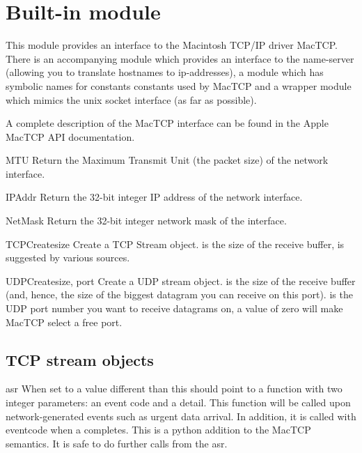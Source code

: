 \section{Built-in module }
\renewcommand{\indexsubitem}{(in module mactcp)}

This module provides an interface to the Macintosh TCP/IP driver
MacTCP. There is an accompanying module  which provides an
interface to the name-server (allowing you to translate hostnames to
ip-addresses), a module  which has symbolic names for
constants constants used by MacTCP and a wrapper module 
which mimics the unix socket interface (as far as possible).

A complete description of the MacTCP interface can be found in the
Apple MacTCP API documentation.

\begin{funcdesc}{MTU}{}
Return the Maximum Transmit Unit (the packet size) of the network
interface.
\end{funcdesc}

\begin{funcdesc}{IPAddr}{}
Return the 32-bit integer IP address of the network interface.
\end{funcdesc}

\begin{funcdesc}{NetMask}{}
Return the 32-bit integer network mask of the interface.
\end{funcdesc}

\begin{funcdesc}{TCPCreate}{size}
Create a TCP Stream object.  is the size of the receive
buffer,  is suggested by various sources.
\end{funcdesc}

\begin{funcdesc}{UDPCreate}{size, port}
Create a UDP stream object.  is the size of the receive
buffer (and, hence, the size of the biggest datagram you can receive
on this port).  is the UDP port number you want to receive
datagrams on, a value of zero will make MacTCP select a free port.
\end{funcdesc}

\subsection{TCP stream objects}
\renewcommand{\indexsubitem}{(TCP stream method)}

\begin{datadesc}{asr}
When set to a value different than  this should point to a
function with two integer parameters: an event code and a detail. This
function will be called upon network-generated events such as urgent
data arrival. In addition, it is called with eventcode
 when a  completes. This
is a python addition to the MacTCP semantics.
It is safe to do further calls from the asr.
\end{datadesc}

